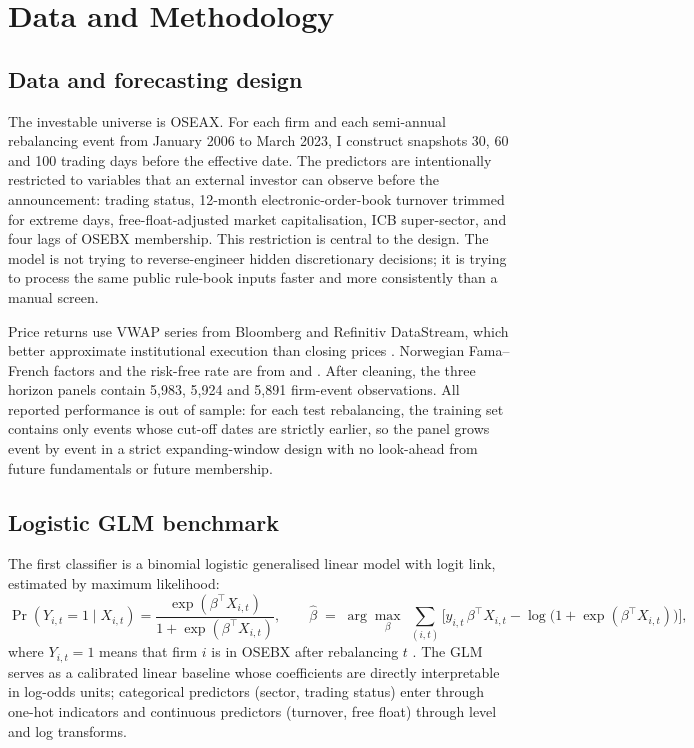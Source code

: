\section{Data and Methodology}
\label{sec:data}

\subsection{Data and forecasting design}

The investable universe is OSEAX. For each firm and each semi-annual rebalancing event from January 2006 to March 2023, I construct snapshots 30, 60 and 100 trading days before the effective date. The predictors are intentionally restricted to variables that an external investor can observe before the announcement: trading status, 12-month electronic-order-book turnover trimmed for extreme days, free-float-adjusted market capitalisation, ICB super-sector, and four lags of OSEBX membership. This restriction is central to the design. The model is not trying to reverse-engineer hidden discretionary decisions; it is trying to process the same public rule-book inputs faster and more consistently than a manual screen.

Price returns use VWAP series from Bloomberg and Refinitiv DataStream, which better approximate institutional execution than closing prices \parencite{madhavan-vwap,bloomberg-terminal,lseg-refinitiv}. Norwegian Fama--French factors and the risk-free rate are from \textcite{bernt-fama-french} and \textcite{bernt-risk-free}. After cleaning, the three horizon panels contain 5{,}983, 5{,}924 and 5{,}891 firm-event observations. All reported performance is out of sample: for each test rebalancing, the training set contains only events whose cut-off dates are strictly earlier, so the panel grows event by event in a strict expanding-window design with no look-ahead from future fundamentals or future membership.

\subsection{Logistic GLM benchmark}

The first classifier is a binomial logistic generalised linear model with logit link, estimated by maximum likelihood:
\begin{equation}
\Pr(Y_{i,t}=1 \mid X_{i,t}) = \frac{\exp(\beta^\top X_{i,t})}{1+\exp(\beta^\top X_{i,t})},
\qquad
\hat{\beta} \;=\; \arg\max_{\beta}\;\sum_{(i,t)}\!\Big[y_{i,t}\,\beta^\top X_{i,t} - \log\!\big(1+\exp(\beta^\top X_{i,t})\big)\Big],
\label{eq:glm}
\end{equation}
where $Y_{i,t}=1$ means that firm $i$ is in OSEBX after rebalancing $t$ \parencite{glm-generalized-linear-models}. The GLM serves as a calibrated linear baseline whose coefficients are directly interpretable in log-odds units; categorical predictors (sector, trading status) enter through one-hot indicators and continuous predictors (turnover, free float) through level and log transforms.


